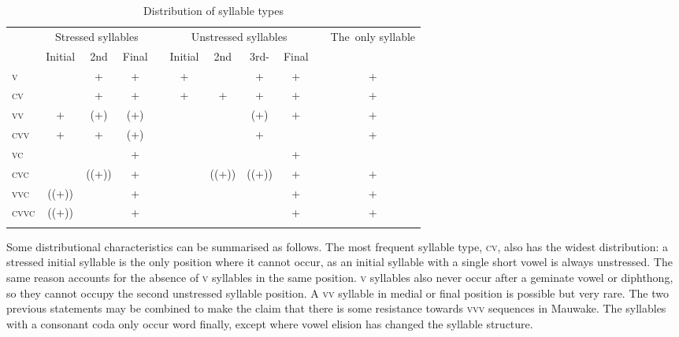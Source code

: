 \begin{table}
\caption{Distribution of syllable types}
\label{tab:7:syllabletypes}
  \begin{tabular}{lcccccccccc}
  \mytoprule
  \multirow{2}{*}{\parbox{1cm}{Syllable\\type}} & \multicolumn{3}{c}{Stressed syllables} &  & \multicolumn{4}{c}{Unstressed syllables}  &  & \multirow{2}{*}{\parbox{1.2cm}{\mbox{The only} \mbox{syllable}}}\\
  & Initial & 2nd & Final &  & Initial & 2nd & 3rd- & Final &  & \\
  \midrule
  \textsc{v} &  & + & + &  & + &  & + & + &  & +\\
  \textsc{cv} &  & + & + &  & + & + & + & + &  & +\\
  \textsc{vv} & + & (+) & (+) &  &  &  & (+) & + &  & +\\
  \textsc{cvv} & + & + & (+) &  &  &  & + &  &  & +\\
  \textsc{vc} &  &  & + &  &  &  &  & + &  & \\
  \textsc{cvc} &  & ((+)) & + &  &  & ((+)) & ((+)) & + &  & +\\
  \textsc{vvc} & ((+)) &  & + &  &  &  &  & + &  & +\\
  \textsc{cvvc} & ((+)) &  & + &  &  &  &  & + &  & +\\
  \mybottomrule
  \end{tabular}
\end{table}



Some distributional characteristics can be summarised as follows.  The most frequent syllable type, \textsc{cv}, also has the widest distribution: a stressed initial syllable is the only position where it cannot occur, as an initial syllable with a single short vowel is always unstressed. The same reason accounts for the absence of \textsc{v} syllables in the same position. \textsc{v} syllables also never occur after a geminate vowel or diphthong, so they cannot occupy the second unstressed syllable position. A \textsc{vv} syllable in medial or final position is possible but very rare. The two previous statements may be combined to make the claim that there is some resistance towards \textsc{vvv} sequences in Mauwake. The syllables with a consonant coda only occur word finally, except where vowel elision has changed the syllable structure.  

